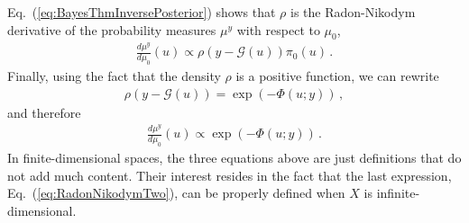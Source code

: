 Eq.~(\ref{eq:BayesThmInversePosterior}) shows that $\rho$ is
the Radon-Nikodym derivative of the probability measures $\mu^y$
with respect to $\mu_0$, \viz 
\begin{align}
  \label{eq:RadonNikodym}
  \frac{d\mu^y}{d\mu_0} (u) \propto \rho(y-\mathcal G(u)) \pi_0(u)\, .
\end{align}
Finally, using the fact that the density $\rho$ is a positive
function, we can rewrite 
\begin{align}
  \label{eq:PotentialDef}
  \rho(y-\mathcal G(u)) = \exp\left(-\Phi(u;y)\right)\, ,
\end{align}
and therefore
\begin{align}
  \label{eq:RadonNikodymTwo}
  \frac{d\mu^y}{d\mu_0} (u) \propto \exp\left(-\Phi(u;y)\right)\, .
\end{align}
In finite-dimensional spaces, the three equations above are just
definitions that do not add much content. Their interest resides in
the fact that the last expression, Eq.~(\ref{eq:RadonNikodymTwo}), can
be properly defined when $X$ is infinite-dimensional.

